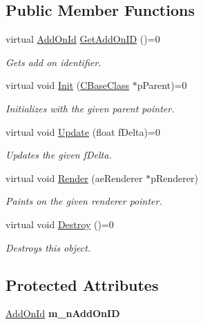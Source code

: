 \subsection*{Public Member Functions}
\begin{DoxyCompactItemize}
\item 
virtual \hyperlink{_add_on_8h_a10abdd289149f0a510d47930d565b1ea}{Add\+On\+Id} \hyperlink{class_c_add_on_ade32fcee89c330f6c04bb0654a97d269}{Get\+Add\+On\+ID} ()=0
\begin{DoxyCompactList}\small\item\em Gets add on identifier. \end{DoxyCompactList}\item 
virtual void \hyperlink{class_c_add_on_a46d1ab2cbbf46f8df800baff1d053f2b}{Init} (\hyperlink{class_c_base_class}{C\+Base\+Class} $\ast$p\+Parent)=0
\begin{DoxyCompactList}\small\item\em Initializes with the given parent pointer. \end{DoxyCompactList}\item 
virtual void \hyperlink{class_c_add_on_af7d49c59fd975bcc7b98e14f437cc1ae}{Update} (float f\+Delta)=0
\begin{DoxyCompactList}\small\item\em Updates the given f\+Delta. \end{DoxyCompactList}\item 
virtual void \hyperlink{class_c_add_on_a7b087304403fcf8581ba9668c4b08f0b}{Render} (ae\+Renderer $\ast$p\+Renderer)
\begin{DoxyCompactList}\small\item\em Paints on the given renderer pointer. \end{DoxyCompactList}\item 
virtual void \hyperlink{class_c_add_on_acad6668a72b1f9e4018376239b367583}{Destroy} ()=0\hypertarget{class_c_add_on_acad6668a72b1f9e4018376239b367583}{}\label{class_c_add_on_acad6668a72b1f9e4018376239b367583}

\begin{DoxyCompactList}\small\item\em Destroys this object. \end{DoxyCompactList}\end{DoxyCompactItemize}
\subsection*{Protected Attributes}
\begin{DoxyCompactItemize}
\item 
\hyperlink{_add_on_8h_a10abdd289149f0a510d47930d565b1ea}{Add\+On\+Id} {\bfseries m\+\_\+n\+Add\+On\+ID}\hypertarget{class_c_add_on_adb277daf857fd09ae3a8b0153dfb6650}{}\label{class_c_add_on_adb277daf857fd09ae3a8b0153dfb6650}

\end{DoxyCompactItemize}


